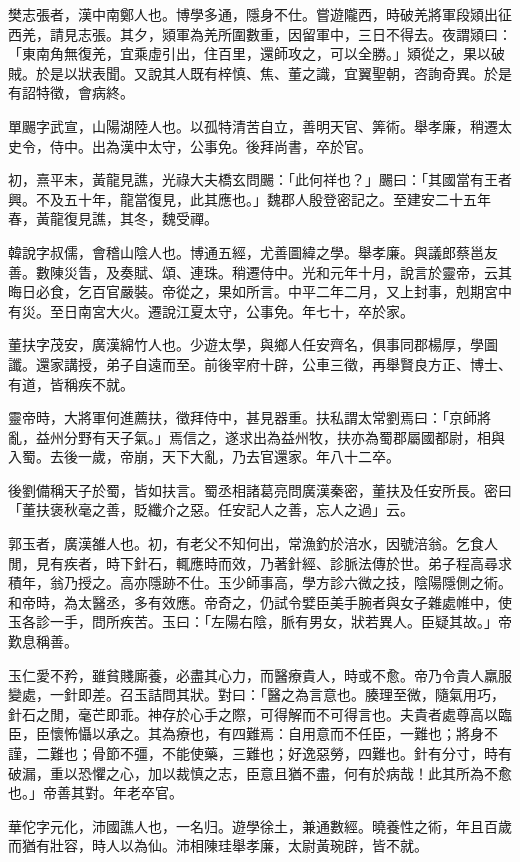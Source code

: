\begin{pinyinscope}
樊志張者，漢中南鄭人也。博學多通，隱身不仕。嘗遊隴西，時破羌將軍段熲出征西羌，請見志張。其夕，熲軍為羌所圍數重，因留軍中，三日不得去。夜謂熲曰：「東南角無復羌，宜乘虛引出，住百里，還師攻之，可以全勝。」熲從之，果以破賊。於是以狀表聞。又說其人既有梓慎、焦、董之識，宜翼聖朝，咨詢奇異。於是有詔特徵，會病終。

單颺字武宣，山陽湖陸人也。以孤特清苦自立，善明天官、筭術。舉孝廉，稍遷太史令，侍中。出為漢中太守，公事免。後拜尚書，卒於官。

初，熹平末，黃龍見譙，光祿大夫橋玄問颺：「此何祥也？」颺曰：「其國當有王者興。不及五十年，龍當復見，此其應也。」魏郡人殷登密記之。至建安二十五年春，黃龍復見譙，其冬，魏受禪。

韓說字叔儒，會稽山陰人也。博通五經，尤善圖緯之學。舉孝廉。與議郎蔡邕友善。數陳災眚，及奏賦、頌、連珠。稍遷侍中。光和元年十月，說言於靈帝，云其晦日必食，乞百官嚴裝。帝從之，果如所言。中平二年二月，又上封事，剋期宮中有災。至日南宮大火。遷說江夏太守，公事免。年七十，卒於家。

董扶字茂安，廣漢綿竹人也。少遊太學，與鄉人任安齊名，俱事同郡楊厚，學圖讖。還家講授，弟子自遠而至。前後宰府十辟，公車三徵，再舉賢良方正、博士、有道，皆稱疾不就。

靈帝時，大將軍何進薦扶，徵拜侍中，甚見器重。扶私謂太常劉焉曰：「京師將亂，益州分野有天子氣。」焉信之，遂求出為益州牧，扶亦為蜀郡屬國都尉，相與入蜀。去後一歲，帝崩，天下大亂，乃去官還家。年八十二卒。

後劉備稱天子於蜀，皆如扶言。蜀丞相諸葛亮問廣漢秦密，董扶及任安所長。密曰「董扶褒秋毫之善，貶纖介之惡。任安記人之善，忘人之過」云。

郭玉者，廣漢雒人也。初，有老父不知何出，常漁釣於涪水，因號涪翁。乞食人閒，見有疾者，時下針石，輒應時而效，乃著針經、診脈法傳於世。弟子程高尋求積年，翁乃授之。高亦隱跡不仕。玉少師事高，學方診六微之技，陰陽隱側之術。和帝時，為太醫丞，多有效應。帝奇之，仍試令嬖臣美手腕者與女子雜處帷中，使玉各診一手，問所疾苦。玉曰：「左陽右陰，脈有男女，狀若異人。臣疑其故。」帝歎息稱善。

玉仁愛不矜，雖貧賤廝養，必盡其心力，而醫療貴人，時或不愈。帝乃令貴人羸服變處，一針即差。召玉詰問其狀。對曰：「醫之為言意也。腠理至微，隨氣用巧，針石之閒，毫芒即乖。神存於心手之際，可得解而不可得言也。夫貴者處尊高以臨臣，臣懷怖懾以承之。其為療也，有四難焉：自用意而不任臣，一難也；將身不謹，二難也；骨節不彊，不能使藥，三難也；好逸惡勞，四難也。針有分寸，時有破漏，重以恐懼之心，加以裁慎之志，臣意且猶不盡，何有於病哉！此其所為不愈也。」帝善其對。年老卒官。

華佗字元化，沛國譙人也，一名归。遊學徐土，兼通數經。曉養性之術，年且百歲而猶有壯容，時人以為仙。沛相陳珪舉孝廉，太尉黃琬辟，皆不就。


\end{pinyinscope}

